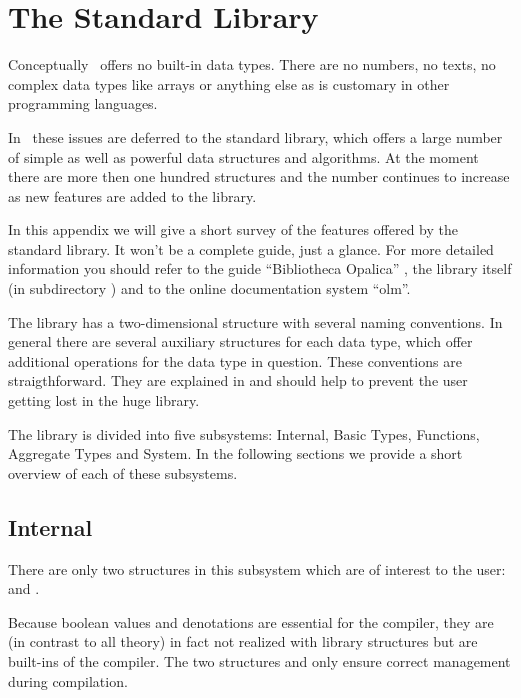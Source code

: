 \chapter{The Standard Library}
\label{chap:lib}
\label{sec:predef}
\novice
Conceptually \opal\ offers no built-in data types. There are no
numbers, no texts, no complex data types like arrays or anything else
as is customary in other programming languages.

In \opal\ these issues are deferred to the standard library, which
offers a large number of simple as well as powerful data structures
and algorithms.
At the moment there are more then one hundred structures and the
number continues to  increase as new features are added to the library.

In this appendix we will give a short survey of the features
offered by the standard library. 
It won't be a complete guide, just a glance.
For more detailed information you should refer to the guide
``Bibliotheca Opalica'' \cite{Di}, the library itself
(in subdirectory ) and  to the online documentation
system ``olm''.

\medskip
The library has a two-dimensional structure with several naming
conventions. In general there are several auxiliary structures for
each data type, which offer additional operations for the data
type in question.
These conventions are straigthforward.
They are explained in \cite{Di} and should help to prevent the user
getting lost in the huge library.

\bigskip
The library is divided into five subsystems: Internal, Basic Types,
Functions, Aggregate Types and System.
In the following sections we provide a short overview of each of
these subsystems.


\section{Internal}
\label{denotations}
\novice There are only two  structures in this subsystem which are
of interest to the user:  and . 

Because boolean values and denotations are essential for the compiler,
they are (in contrast to all theory) in fact not realized with library
structures but are built-ins of the compiler. 
The two structures  and  only ensure correct
management during compilation.

